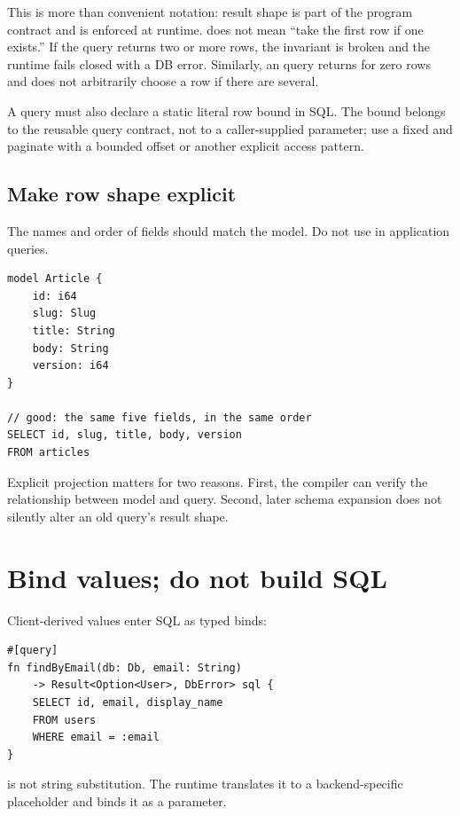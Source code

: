 This is more than convenient notation: result shape is part of the program contract and is enforced at runtime.  does not mean ``take the first row if one exists.'' If the query returns two or more rows, the invariant is broken and the runtime fails closed with a DB error. Similarly, an  query returns  for zero rows and does not arbitrarily choose a row if there are several.

A  query must also declare a static literal row bound in SQL. The bound belongs to the reusable query contract, not to a caller-supplied  parameter; use a fixed  and paginate with a bounded offset or another explicit access pattern.

\subsection*{Make row shape explicit}

The names and order of  fields should match the model. Do not use  in application queries.

\begin{lstlisting}[language=Velran]
model Article {
    id: i64
    slug: Slug
    title: String
    body: String
    version: i64
}

// good: the same five fields, in the same order
SELECT id, slug, title, body, version
FROM articles
\end{lstlisting}

Explicit projection matters for two reasons. First, the compiler can verify the relationship between model and query. Second, later schema expansion does not silently alter an old query's result shape.

\section{Bind values; do not build SQL}

Client-derived values enter SQL as typed binds:

\begin{lstlisting}[language=Velran]
#[query]
fn findByEmail(db: Db, email: String)
    -> Result<Option<User>, DbError> sql {
    SELECT id, email, display_name
    FROM users
    WHERE email = :email
}
\end{lstlisting}

 is not string substitution. The runtime translates it to a backend-specific placeholder and binds it as a parameter.

